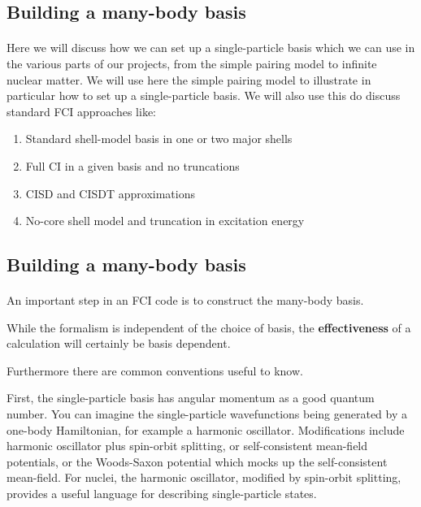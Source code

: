 \noindent
\subsection*{Building a many-body basis}

\paragraph{}
Here we will discuss how we can set up a single-particle basis which we can use in the various parts of our projects, from the simple pairing model to infinite nuclear matter. We will use here the simple pairing model to illustrate in particular how to set up a single-particle basis. We will also use this do discuss standard FCI approaches like:
\begin{enumerate}
 \item Standard shell-model basis in one or two major shells

 \item Full CI in a given basis and no truncations

 \item CISD and CISDT approximations

 \item No-core shell model and truncation in excitation energy
\end{enumerate}

\noindent



\subsection*{Building a many-body basis}

\paragraph{}
An important step in an FCI code  is to construct the many-body basis.  

While the formalism is independent of the choice of basis, the \textbf{effectiveness} of a calculation 
will certainly be basis dependent. 

Furthermore there are common conventions useful to know.

First, the single-particle basis has angular momentum as a good quantum number.  You can 
imagine the single-particle wavefunctions being generated by a one-body Hamiltonian, 
for example a harmonic oscillator.  Modifications include harmonic oscillator plus 
spin-orbit splitting, or self-consistent mean-field potentials, or the Woods-Saxon potential which mocks 
up the self-consistent mean-field. 
For nuclei, the harmonic oscillator, modified by spin-orbit splitting, provides a useful language 
for describing single-particle states.



